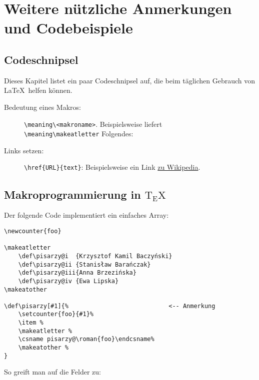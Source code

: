 	\chapter{Weitere nützliche Anmerkungen und Codebeispiele}
		\section{Codeschnipsel}
			Dieses Kapitel listet ein paar Codeschnipsel auf, die beim täglichen Gebrauch von \LaTeX\ helfen können.
			\begin{description}
				\item[Bedeutung eines Makros:]
					\verb|\meaning\<makroname>|. Beispielsweise liefert\\\verb|\meaning\makeatletter| Folgendes: \texttt{\meaning\makeatletter}
				\item[Links setzen:]
					\verb|\href{URL}{text}|: Beispielsweise ein Link \href{https://de.wikipedia.org/wiki/LaTeX}{zu Wikipedia}.
			\end{description}
			
		\section{Makroprogrammierung in ${\mathrm{T\!_{\displaystyle E}\!X}}$}
			Der folgende Code implementiert ein einfaches Array:
			\begin{verbatim}
\newcounter{foo}

\makeatletter
    \def\pisarzy@i 	{Krzysztof Kamil Baczyński}
    \def\pisarzy@ii	{Stanisław Barańczak}
    \def\pisarzy@iii{Anna Brzezińska}
    \def\pisarzy@iv {Ewa Lipska}
\makeatother

\def\pisarzy[#1]{%                            <-- Anmerkung
    \setcounter{foo}{#1}%
    \item %
    \makeatletter %
    \csname pisarzy@\roman{foo}\endcsname%
    \makeatother %
}
			\end{verbatim}
			
			\makeatletter
				\def\pisarzy@i 	{Krzysztof Kamil Baczyński}
				\def\pisarzy@ii	{Stanisław Barańczak}
				\def\pisarzy@iii{Anna Brzezińska}
				\def\pisarzy@iv {Ewa Lipska}
			\makeatother
			
			\def\pisarzy[#1]{%
				\setcounter{foo}{#1}%
				\item %
				\makeatletter %
				\csname pisarzy@\roman{foo}\endcsname%
				\makeatother %
			}
			
			\newpage
			So greift man auf die Felder zu: 
			
